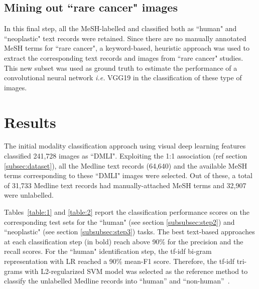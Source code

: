 \documentclass[]{spie}  %
\begin{document}
\subsection{Mining out ``rare cancer" images} 
\label{subsubsec:step4}
%
In this final step, all the MeSH-labelled and classified both as ``human" and ``neoplastic" text records were retained.
Since there are no manually annotated MeSH terms for ``rare cancer", a keyword-based, heuristic approach was used to extract the corresponding text records and images from ``rare cancer" studies.
This new subset was used as ground truth to estimate the performance of a convolutional neural network \emph{i.e.} VGG19 in the classification of these type of images.
%
\section{Results}
\label{sec:results}
%
The initial modality classification approach using visual deep learning features classified 241,728 images as ``DMLI".
Exploiting the 1:1 association (ref section \ref{subsec:dataset}), all the Medline text records (64,640) and the available MeSH terms corresponding to these ``DMLI" images were selected.
Out of these, a total of 31,733 Medline text records had manually-attached MeSH terms and 32,907 were unlabelled.

Tables~\ref{table:1} and \ref{table:2} report the classification performance scores on the corresponding test sets for the ``human" (see section \ref{subsubsec:step2}) and ``neoplastic" (see section \ref{subsubsec:step3}) tasks. 
The best text-based approaches at each classification step (in bold) reach above 90\% for the precision and the recall scores. 
For the ``human" identification step, the tf-idf bi-gram representation with LR reached a 90\% mean-F1 score. 
Therefore, the tf-idf tri-grams with L2-regularized SVM model was selected as the reference method to classify the unlabelled Medline records into ``human'' and ``non-human''~\cite{le2014distributed}.
\end{document}
